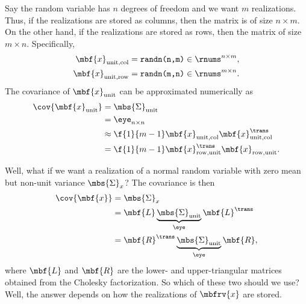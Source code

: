 Say the random variable has $n$ degrees of freedom and we want $m$ realizations. Thus, if the realizations are stored as columns, then the matrix is of size $n\times m$. On the other hand, if the realizations are stored as rows, then the matrix of size $m\times n$. Specifically,
\begin{align}
    \mbf{x}_{\mathrm{unit, col}} &= \texttt{randn(n,m)}\in\rnums^{n\times m},\\
    \mbf{x}_{\mathrm{unit, row}} &= \texttt{randn(m,n)}\in\rnums^{m\times n}.
\end{align}
The covariance of $\mbf{x}_{\mathrm{unit}}$ can be approximated numerically as
\begin{align}
    \cov{\mbf{x}_{\mathrm{unit}}} 
    &= \mbs{\Sigma}_{\mathrm{unit}}\\
    &= \eye_{n\times n}\\
    \label{eq:unit covariance col. realizations}
    &\approx \f{1}{m-1}\mbf{x}_{\mathrm{unit, col}}\mbf{x}_{\mathrm{unit, col}}^{\trans}\\
    \label{eq:unit covariance row. realizations}
    &= \f{1}{m-1}\mbf{x}_{\mathrm{row, unit}}^{\trans}\mbf{x}_{\mathrm{row, unit}}.
\end{align}

Well, what if we want a realization of a normal random variable with zero mean but non-unit variance $\mbs{\Sigma}_{x}$? The covariance is then
\begin{align}
    \cov{\mbf{x}} 
    &= \mbs{\Sigma}_{x}\\
    &= \mbf{L}\underbrace{\mbs{\Sigma}_{\mathrm{unit}}}_{\eye}\mbf{L}^{\trans}\\
    &= \mbf{R}^{\trans}\underbrace{\mbs{\Sigma}_{\mathrm{unit}}}_{\eye}\mbf{R},
\end{align}
where $\mbf{L}$ and $\mbf{R}$ are the lower- and upper-triangular matrices obtained from the Cholesky factorization. So which of these two should we use? Well, the answer depends on how the realizations of $\mbfrv{x}$ are stored. 


